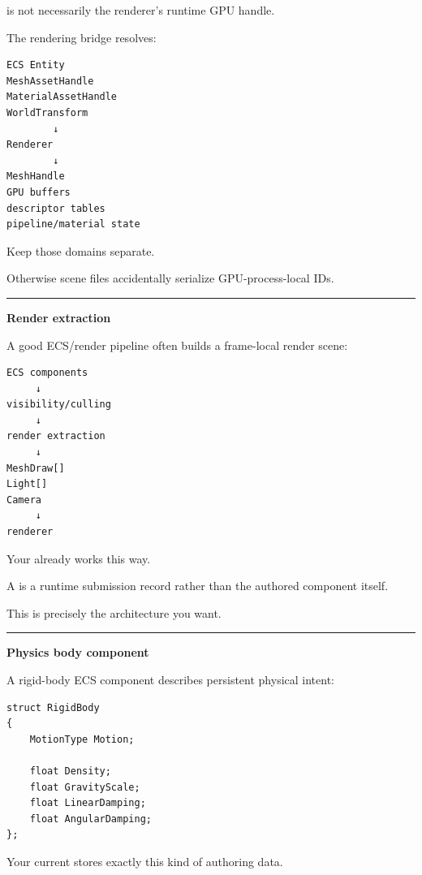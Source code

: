 is not necessarily the renderer's runtime GPU handle.

The rendering bridge resolves:

\begin{verbatim}
ECS Entity
MeshAssetHandle
MaterialAssetHandle
WorldTransform
        ↓
Renderer
        ↓
MeshHandle
GPU buffers
descriptor tables
pipeline/material state
\end{verbatim}

Keep those domains separate.

Otherwise scene files accidentally serialize GPU-process-local IDs.

\begin{center}\rule{0.5\linewidth}{0.5pt}\end{center}

\textbf{Render extraction}

A good ECS/render pipeline often builds a frame-local render scene:

\begin{verbatim}
ECS components
     ↓
visibility/culling
     ↓
render extraction
     ↓
MeshDraw[]
Light[]
Camera
     ↓
renderer
\end{verbatim}

Your  already works this way.

A  is a runtime submission record rather than the authored component itself.

This is precisely the architecture you want.

\begin{center}\rule{0.5\linewidth}{0.5pt}\end{center}

\textbf{Physics body component}

A rigid-body ECS component describes persistent physical intent:

\begin{verbatim}
struct RigidBody
{
    MotionType Motion;

    float Density;
    float GravityScale;
    float LinearDamping;
    float AngularDamping;
};
\end{verbatim}

Your current  stores exactly this kind of authoring data.

